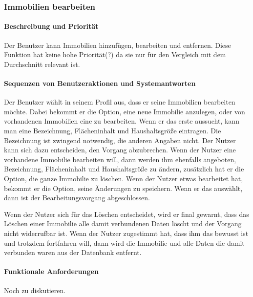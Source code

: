 \subsubsection{Immobilien bearbeiten}
\paragraph{Beschreibung und Priorität}
Der Benutzer kann Immobilien hinzufügen,
bearbeiten und entfernen. %
Diese Funktion hat keine hohe Priorität(?) da sie nur für den Vergleich mit dem Durchschnitt relevant ist. %
\paragraph{Sequenzen von Benutzeraktionen und Systemantworten}
Der Benutzer wählt in seinem Profil aus,
dass er seine Immobilien bearbeiten möchte.
Dabei bekommt er die Option, eine neue Immobilie anzulegen,
oder von vorhandenen Immobilien eine zu bearbeiten.
Wenn er das erste aussucht, kann man eine Bezeichnung,
Flächeninhalt und Haushaltsgröße %
eintragen. Die Bezeichnung ist zwingend notwendig, %
die anderen Angaben nicht.
Der Nutzer kann sich dazu entscheiden, den Vorgang abzubrechen.
Wenn der Nutzer eine vorhandene Immobilie bearbeiten will,
dann werden ihm ebenfalls angeboten, Bezeichnung, Flächeninhalt und
Haushaltsgröße zu ändern,
zusätzlich hat er die Option, die ganze Immobilie zu löschen.
Wenn der Nutzer etwas bearbeitet hat, bekommt er die Option, seine Änderungen zu speichern.
Wenn er das auswählt, dann ist der Bearbeitungsvorgang abgeschlossen.

Wenn der Nutzer sich für das Löschen entscheidet, wird er final gewarnt,
dass das Löschen einer Immobilie alle damit verbundenen Daten löscht und der Vorgang nicht widerrufbar ist.
Wenn der Nutzer zugestimmt hat, dass ihm das bewusst ist und trotzdem fortfahren will, dann wird die Immobilie und alle Daten die damit verbunden waren aus der Datenbank entfernt.

\paragraph{Funktionale Anforderungen}
Noch zu diskutieren.

